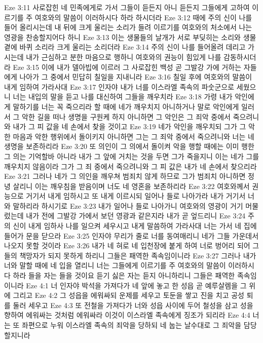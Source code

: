 Eze 3:11  사로잡힌 네 민족에게로 가서 그들이 듣든지 아니 듣든지 그들에게 고하여 이르기를 주 여호와의 말씀이 이러하시다 하라 하시더라
Eze 3:12  때에 주의 신이 나를 들어 올리시는데 내 뒤에 크게 울리는 소리가 들려 이르기를 여호와의 처소에서 나는 영광을 찬송할지어다 하니
Eze 3:13  이는 생물들의 날개가 서로 부딪히는 소리와 생물 곁에 바퀴 소리라 크게 울리는 소리더라
Eze 3:14  주의 신이 나를 들어올려 데리고 가시는데 내가 근심하고 분한 마음으로 행하니 여호와의 권능이 힘있게 나를 감동하시더라
Eze 3:15  이에 내가 델아빕에 이르러 그 사로잡힌 백성 곧 그발강 가에 거하는 자들에게 나아가 그 중에서 민답히 칠일을 지내니라
Eze 3:16  칠일 후에 여호와의 말씀이 내게 임하여 가라사대
Eze 3:17  인자야 내가 너를 이스라엘 족속의 파숫군으로 세웠으니 너는 내입의 말을 듣고 나를 대신하여 그들을 깨우치라
Eze 3:18  가령 내가 악인에게 말하기를 너는 꼭 죽으리라 할 때에 네가 깨우치지 아니하거나 말로 악인에게 일러서 그 악한 길을 떠나 생명을 구원케 하지 아니하면 그 악인은 그 죄악 중에서 죽으려니와 내가 그 피 값을 네 손에서 찾을 것이고
Eze 3:19  네가 악인을 깨우치되 그가 그 악한 마음과 악한 행위에서 돌이키지 아니하면 그는 그 죄악 중에서 죽으려니와 너는 네 생명을 보존하리라
Eze 3:20  또 의인이 그 의에서 돌이켜 악을 행할 때에는 이미 행한 그 의는 기억할바 아니라 내가 그 앞에 거치는 것을 두면 그가 죽을지니 이는 네가 그를 깨우치지 않음이라 그가 그 죄 중에서 죽으려니와 그 피 값은 내가 네 손에서 찾으리라
Eze 3:21  그러나 네가 그 의인을 깨우쳐 범죄치 않게 하므로 그가 범죄치 아니하면 정녕 살리니 이는 깨우침을 받음이며 너도 네 영혼을 보존하리라
Eze 3:22  여호와께서 권능으로 거기서 내게 임하시고 또 내게 이르시되 일어나 들로 나아가라 내가 거기서 너와 말하리라 하시기로
Eze 3:23  내가 일어나 들로 나아가니 여호와의 영광이 거기 머물렀는데 내가 전에 그발강 가에서 보던 영광과 같은지라 내가 곧 엎드리니
Eze 3:24  주의 신이 내게 임하사 나를 일으켜 세우시고 내게 말씀하여 가라사대 너는 가서 네 집에 들어가 문을 닫으라
Eze 3:25  인자야 무리가 줄로 너를 동여매리니 네가 그들 가운데서 나오지 못할 것이라
Eze 3:26  내가 네 혀로 네 입천장에 붙게 하여 너로 벙어리 되어 그들의 책망자가 되지 못하게 하리니 그들은 패역한 족속임이니라
Eze 3:27  그러나 내가 너와 말할 때에 네 입을 열리니 너는 그들에게 이르기를 주 여호와의 말씀이 이러하시다 하라 들을 자는 들을 것이요 듣기 싫은 자는 듣지 아니하리니 그들은 패역한 족속임이니라
Eze 4:1  너 인자야 박석을 가져다가 네 앞에 놓고 한 성읍 곧 예루살렘을 그 위에 그리고
Eze 4:2  그 성읍을 에워싸되 운제를 세우고 토둔을 쌓고 진을 치고 공성 퇴를 둘러 세우고
Eze 4:3  또 전철을 가져다가 너와 성읍 사이에 두어 철성을 삼고 성을 향하여 에워싸는 것처럼 에워싸라 이것이 이스라엘 족속에게 징조가 되리라
Eze 4:4  너는 또 좌편으로 누워 이스라엘 족속의 죄악을 당하되 네 눕는 날수대로 그 죄악을 담당할지니라
